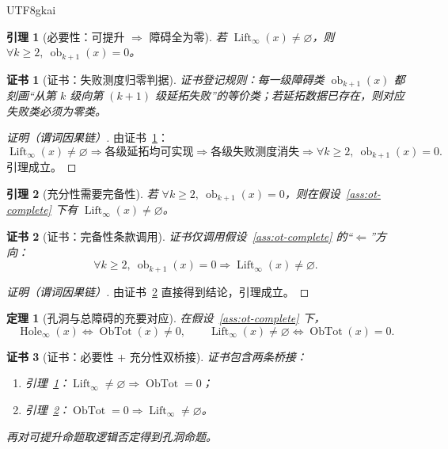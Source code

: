 \documentclass[12pt]{article}
\newtheorem{theorem}{定理}[section]
\newtheorem{lemma}{引理}[section]
\newtheorem{Certificate}{证书}[section]
\newcommand{\ObTot}{\operatorname{ObTot}}
\newcommand{\Hole}{\operatorname{Hole}}
\newcommand{\Lift}{\operatorname{Lift}}
\begin{document}
\begin{CJK*}{UTF8}{gkai}
\begin{lemma}[必要性：可提升 $\Rightarrow$ 障碍全为零]\label{lem:ob-necessary}
若 $\Lift_\infty(x)\neq\varnothing$，则 $\forall k\ge2,\ \operatorname{ob}_{k+1}(x)=0$。
\end{lemma}

\begin{Certificate}[证书：失败测度归零判据]\label{cert:ob-necessary}
证书登记规则：每一级障碍类 $\operatorname{ob}_{k+1}(x)$ 都刻画“从第 $k$ 级向第 $(k+1)$ 级延拓失败”的等价类；若延拓数据已存在，则对应失败类必须为零类。
\end{Certificate}

\begin{proof}[证明（谓词因果链）]
由证书~\ref{cert:ob-necessary}：
\[
\Lift_\infty(x)\neq\varnothing
\Rightarrow
\text{各级延拓均可实现}
\Rightarrow
\text{各级失败测度消失}
\Rightarrow
\forall k\ge2,\ \operatorname{ob}_{k+1}(x)=0.
\]
引理成立。
\end{proof}

\begin{lemma}[充分性需要完备性]\label{lem:ob-sufficient}
若 $\forall k\ge2,\ \operatorname{ob}_{k+1}(x)=0$，则在假设~\ref{ass:ot-complete} 下有 $\Lift_\infty(x)\neq\varnothing$。
\end{lemma}

\begin{Certificate}[证书：完备性条款调用]\label{cert:ob-sufficient}
证书仅调用假设~\ref{ass:ot-complete} 的“$\Leftarrow$”方向：
\[
\forall k\ge2,\ \operatorname{ob}_{k+1}(x)=0
\Rightarrow
\Lift_\infty(x)\neq\varnothing.
\]
\end{Certificate}

\begin{proof}[证明（谓词因果链）]
由证书~\ref{cert:ob-sufficient} 直接得到结论，引理成立。
\end{proof}

\begin{theorem}[孔洞与总障碍的充要对应]\label{thm:hole-iff-obtot}
在假设~\ref{ass:ot-complete} 下，
\[
\Hole_\infty(x)\iff \ObTot(x)\neq 0,
\qquad
\Lift_\infty(x)\neq\varnothing \iff \ObTot(x)=0.
\]
\end{theorem}

\begin{Certificate}[证书：必要性 + 充分性双桥接]\label{cert:hole-iff-obtot}
证书包含两条桥接：
\begin{enumerate}
\item 引理~\ref{lem:ob-necessary}：$\Lift_\infty\neq\varnothing\Rightarrow\ObTot=0$；
\item 引理~\ref{lem:ob-sufficient}：$\ObTot=0\Rightarrow\Lift_\infty\neq\varnothing$。
\end{enumerate}
再对可提升命题取逻辑否定得到孔洞命题。
\end{Certificate}


\end{CJK*}
\end{document}
